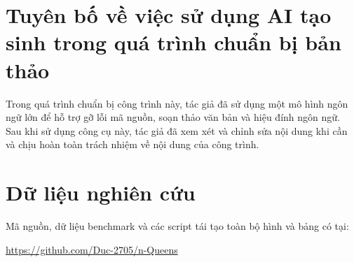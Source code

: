 \documentclass[a4paper,fleqn]{cas-sc}
\begin{document}
\section*{Tuyên bố về việc sử dụng AI tạo sinh trong quá trình chuẩn bị bản thảo}
Trong quá trình chuẩn bị công trình này, tác giả đã sử dụng một mô hình ngôn ngữ
lớn để hỗ trợ gỡ lỗi mã nguồn, soạn thảo văn bản và hiệu đính ngôn ngữ. Sau
khi sử dụng công cụ này, tác giả đã xem xét và chỉnh sửa nội dung khi cần và chịu
hoàn toàn trách nhiệm về nội dung của công trình.




\section*{Dữ liệu nghiên cứu}
Mã nguồn, dữ liệu benchmark và các script tái tạo toàn bộ hình và bảng có tại:
\begin{center}
\url{https://github.com/Duc-2705/n-Queens}
\end{center}
\end{document}
